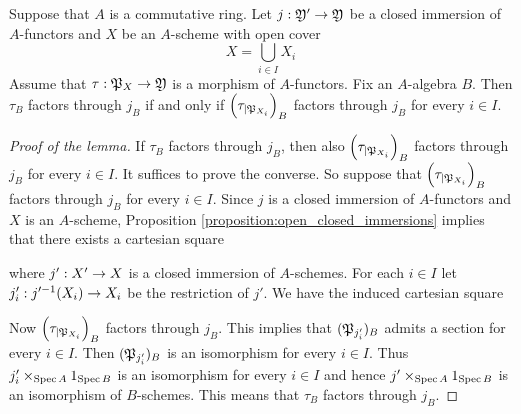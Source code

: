 \begin{lemma}\label{lemma:covers_and_factorizations}
Suppose that $A$ is a commutative ring. Let $j:{\mathfrak Y}'\rightarrow {\mathfrak Y}$ be a closed immersion of $A$-functors and $X$ be an $A$-scheme with open cover
$$X=\bigcup_{i\in I}X_i$$
Assume that $\tau:{\mathfrak P}_X\rightarrow {\mathfrak Y}$ is a morphism of $A$-functors. Fix an $A$-algebra $B$. Then $\tau_B$ factors through $j_B$ if and only if $\left(\tau_{\mid {\mathfrak P}_{X_i}}\right)_B$ factors through $j_B$ for every $i\in I$.
\end{lemma}
\begin{proof}[Proof of the lemma]
If $\tau_B$ factors through $j_B$, then also $\left(\tau_{\mid {\mathfrak P}_{X_i}}\right)_B$ factors through $j_B$ for every $i\in I$. It suffices to prove the converse. So suppose that $\left(\tau_{\mid {\mathfrak P}_{X_i}}\right)_B$ factors through $j_B$ for every $i\in I$. Since $j$ is a closed immersion of $A$-functors and $X$ is an $A$-scheme, Proposition \ref{proposition:open_closed_immersions} implies that there exists a cartesian square
\begin{center}
\end{center}
where $j':X'\rightarrow X$ is a closed immersion of $A$-schemes. For each $i\in I$ let $j'_i:j'^{-1}(X_i)\rightarrow X_i$ be the restriction of $j'$. We have the induced cartesian square
\begin{center}
\end{center}
Now $\left(\tau_{\mid {\mathfrak P}_{X_i}}\right)_B$ factors through $j_B$. This implies that $({\mathfrak P}_{j'_i})_B$ admits a section for every $i\in I$. Then $({\mathfrak P}_{j'_i})_B$ is an isomorphism for every $i\in I$. Thus $j'_i\times_{\mathrm{Spec}\, A}1_{\mathrm{Spec}\, B}$ is an isomorphism for every $i\in I$ and hence $j'\times_{\mathrm{Spec}\, A}1_{\mathrm{Spec}\, B}$ is an isomorphism of $B$-schemes. This means that $\tau_B$ factors through $j_B$.
\end{proof}

